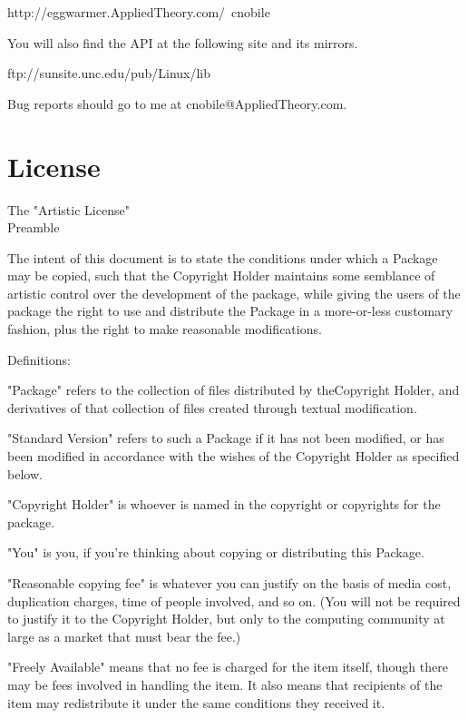 \documentclass[10pt,letterpaper,titlepage]{article}
\newenvironment{lquote}{\begin{list}{}{}\item[]}{\end{list}}
\begin{document}
\noindent
http://eggwarmer.AppliedTheory.com/~cnobile
\vspace{8pt}

\noindent
You will also find the API at the following site and its mirrors.
\vspace{8pt}

\noindent
ftp://sunsite.unc.edu/pub/Linux/lib
\vspace{8pt}

\noindent
Bug reports should go to me at cnobile@AppliedTheory.com.
\pagebreak

\section{License}
\begin{center}
\Large			 The "Artistic License"\\
\vspace{8pt}
\Large				Preamble\\
\end{center}
The intent of this document is to state the conditions under which a Package may be copied, such that the Copyright Holder maintains some semblance of artistic control over the development of the package, while giving the users of the package the right to use and distribute the Package in a more-or-less customary fashion, plus the right to make reasonable modifications.
\vspace{8pt}

\noindent
Definitions:
\begin{lquote}
"Package" refers to the collection of files distributed by the\linebreak Copyright Holder, and derivatives of that collection of files created through textual modification.

"Standard Version" refers to such a Package if it has not been modified, or has been modified in accordance with the wishes of the Copyright Holder as specified below.

"Copyright Holder" is whoever is named in the copyright or copyrights for the package.

"You" is you, if you're thinking about copying or distributing this Package.

"Reasonable copying fee" is whatever you can justify on the basis of media cost, duplication charges, time of people involved, and so on.  (You will not be required to justify it to the Copyright Holder, but only to the computing community at large as a market that must bear the fee.)

"Freely Available" means that no fee is charged for the item itself, though there may be fees involved in handling the item.  It also means that recipients of the item may redistribute it under the same conditions they received it.
\end{lquote}
\end{document}
